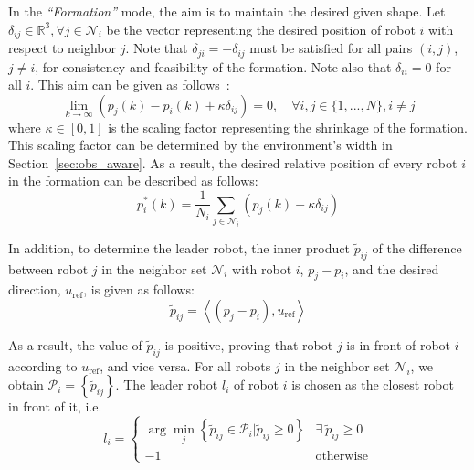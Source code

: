 In the \textit{``Formation''} mode, the aim is to maintain the desired given shape. Let $\delta_{ij}\in\mathbb{R}^3,\forall j\in \mathcal{N}_i$ be the vector representing the desired position of robot $i$ with respect to neighbor $j$. Note that $\delta_{ji}=-\delta_{ij}$ must be satisfied for all pairs $\left(i,j\right)$, $j\neq i$, for consistency and feasibility of the formation. Note also that $\delta_{ii}=0$ for all $i$. This aim can be given as follows~\cite{Dong2016,6798711}:
\begin{equation}
    \lim_{k\to\infty}{\left(p_j(k)-p_i(k)+\kappa\delta_{ij}\right)}=0,\quad\forall i,j\in\{1,...,N\}, i\neq j
\end{equation}
where $\kappa\in[0,1]$ is the scaling factor representing the shrinkage of the formation. This scaling factor can be determined by the environment's width in Section~\ref{sec:obs_aware}. As a result, the desired relative position of every robot $i$ in the formation can be described as follows:
\begin{equation}
    p^*_i(k)=\dfrac{1}{N_i}\sum_{j\in\mathcal{N}_i}{\left(p_j\left(k\right)+\kappa\delta_{ij}\right)}
    \label{eqn:formation}
\end{equation}

In addition, to determine the leader robot, the inner product $\tilde{p}_{ij}$ of the difference between robot $j$ in the neighbor set $\mathcal{N}_i$ with robot $i$, $p_j-p_i$, and the desired direction, $u_\text{ref}$, is given as follows:
\begin{equation}
    \tilde{p}_{ij} = \left\langle (p_j-p_i),u_\text{ref}\right\rangle
    \label{eqn:tildep}
\end{equation}

As a result, the value of $\tilde{p}_{ij}$ is positive, proving that robot $j$ is in front of robot $i$ according to $u_\text{ref}$, and vice versa. For all robots $j$ in the neighbor set $\mathcal{N}_i$, we obtain $\mathcal{P}_i=\left\{\tilde{p}_{ij}\right\}$. The leader robot ${l_i}$ of robot $i$ is chosen as the closest robot in front of it, i.e.
\begin{equation}
     l_i=\begin{cases}
    \arg\min_{j}\left\{\tilde{p}_{ij}\in\mathcal{P}_i\vert\tilde{p}_{ij}\geq0\right\} & \exists~\tilde{p}_{ij}\geq0\\ 
    -1 & \text{otherwise}
     \end{cases}
    \label{eqn:li}
\end{equation}

